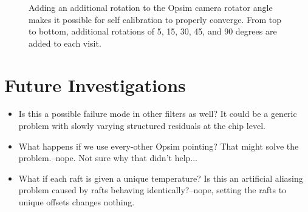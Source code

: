 \begin{figure}
\\
\\
\\
\\
\\
\caption{Adding an additional rotation to the Opsim camera rotator angle makes it possible for self calibration to properly converge.  From top to bottom, additional rotations of  5, 15, 30, 45, and 90 degrees are added to each visit. \label{steprot} }
\end{figure}




\section{Future Investigations}
\begin{itemize}
\item{Is this a possible failure mode in other filters as well?  It could be a generic problem with slowly varying structured residuals at the chip level.}
\item{What happens if we use every-other Opsim pointing?  That might solve the problem.--nope.  Not sure why that didn't help...}
\item{What if each raft is given a unique temperature?  Is this an artificial aliasing problem caused by rafts behaving identically?--nope, setting the rafts to unique offsets changes nothing.}
\end{itemize}
